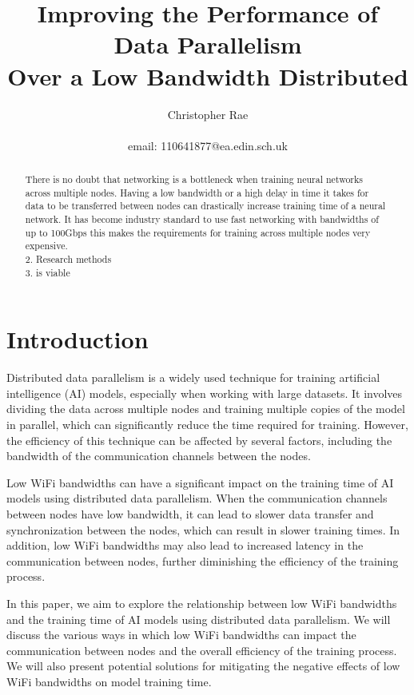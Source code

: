 \documentclass[11pt]{article}
\title{Improving the Performance of Data Parallelism \\Over a Low Bandwidth Distributed }
\author{Christopher Rae \\ \begin{small} email: 110641877@ea.edin.sch.uk \end{small}}
\date{}
\begin{document}
\maketitle


\begin{abstract}
There is no doubt that networking is a bottleneck when training neural networks across multiple nodes. Having a low bandwidth or a high delay in time it takes for data to be transferred between nodes can drastically increase training time of a neural network. It has become industry standard to use fast networking with bandwidths of up to 100Gbps this makes the requirements for training across multiple nodes very expensive. \\
2. Research methods\\
3. is viable
\end{abstract}
\tableofcontents
\newpage

\section{Introduction}
Distributed data parallelism is a widely used technique for training artificial intelligence (AI) models, especially when working with large datasets. It involves dividing the data across multiple nodes and training multiple copies of the model in parallel, which can significantly reduce the time required for training. However, the efficiency of this technique can be affected by several factors, including the bandwidth of the communication channels between the nodes.

Low WiFi bandwidths can have a significant impact on the training time of AI models using distributed data parallelism. When the communication channels between nodes have low bandwidth, it can lead to slower data transfer and synchronization between the nodes, which can result in slower training times. In addition, low WiFi bandwidths may also lead to increased latency in the communication between nodes, further diminishing the efficiency of the training process.

In this paper, we aim to explore the relationship between low WiFi bandwidths and the training time of AI models using distributed data parallelism. We will discuss the various ways in which low WiFi bandwidths can impact the communication between nodes and the overall efficiency of the training process. We will also present potential solutions for mitigating the negative effects of low WiFi bandwidths on model training time.
\end{document}
